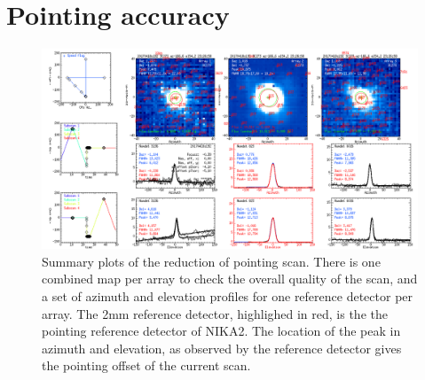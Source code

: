 \section{Pointing accuracy}
\label{se:pointing}

\begin{figure}[htp]
\begin{center}
\includegraphics[clip, angle=0, scale = 0.30]{Figures/plot_20170418s192.png}
\caption{Summary plots of the reduction of pointing scan. There is one combined
  map per array to check the overall quality of the scan, and a set of azimuth
  and elevation profiles for one reference detector per array. The 2mm reference
  detector, highlighed in red, is the the pointing reference detector of
  NIKA2. The location of the peak in azimuth and elevation, as observed by the
  reference detector gives the pointing offset of the current scan.}
\label{fig:ptg}
\end{center}
\end{figure}

